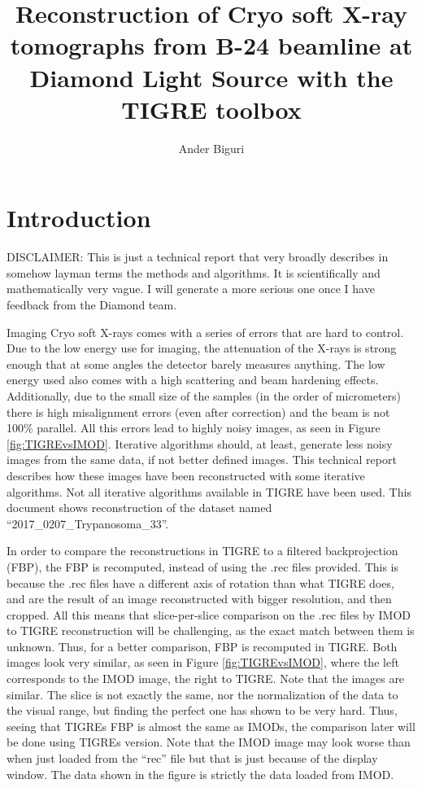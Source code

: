 \documentclass[11pt]{report}
\begin{document}
\title{Reconstruction of Cryo soft X-ray tomographs from B-24 beamline at Diamond Light Source with the TIGRE toolbox}
\author{Ander Biguri}
\maketitle
\chapter*{Introduction}

DISCLAIMER: This is just a technical report that very broadly describes in somehow layman terms the methods and algorithms. It is scientifically and mathematically very vague. I will generate a more serious one once I have feedback from the Diamond team.

Imaging Cryo soft X-rays comes with a series of errors that are hard to control. Due to the low energy use for imaging, the attenuation of the X-rays is strong enough that at some angles the detector barely measures anything. The low energy used also comes with a high scattering and beam hardening effects. Additionally, due to the small size of the samples (in the order of micrometers) there is high misalignment errors (even after correction) and the beam is not 100\% parallel. All this errors lead to highly noisy images, as seen in Figure \ref{fig:TIGREvsIMOD}. Iterative algorithms should, at least, generate less noisy images from the same data, if not better defined images. This technical report describes how these images have been reconstructed with some iterative algorithms. Not all iterative algorithms available in TIGRE have been used. This document shows reconstruction of the dataset named ``2017\_0207\_Trypanosoma\_33''.



In order to compare the reconstructions in TIGRE to a filtered backprojection (FBP), the FBP is recomputed, instead of using the .rec files provided. This is because the .rec files have a different axis of rotation than what TIGRE does, and are the result of an image reconstructed with bigger resolution, and then cropped. All this means that slice-per-slice comparison on the .rec files by IMOD to TIGRE reconstruction will be challenging, as the exact match between them is unknown. Thus, for a better comparison, FBP is recomputed in TIGRE. Both images look very similar, as seen in Figure \ref{fig:TIGREvsIMOD}, where the left corresponds to the IMOD image, the right to TIGRE. Note that the images are similar. The slice is not exactly the same, nor the normalization of the data to the visual range, but finding the perfect one has shown to be very hard. Thus, seeing that TIGREs FBP is almost the same as IMODs, the comparison later will be done using TIGREs version. Note that the IMOD image may look worse than when just loaded from the ``rec'' file but that is just because of the display window. The data shown in the figure is strictly the data loaded from IMOD.
\end{document}
